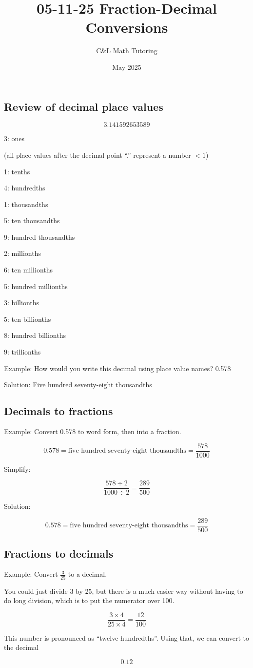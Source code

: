 \documentclass[a4paper, 12pt]{article}
\title{05-11-25 Fraction-Decimal Conversions}
\author{C\&L Math Tutoring}
\date{May 2025}
\begin{document}
\maketitle

\subsection*{Review of decimal place values}

$$3.141592653589$$

3: ones

(all place values after the decimal point ``.'' represent a number $<1$)

1: tenths

4: hundredths

1: thousandths

5: ten thousandths

9: hundred thousandths

2: millionths

6: ten millionths

5: hundred millionths

3: billionths

5: ten billionths

8: hundred billionths

9: trillionths

Example: How would you write this decimal using place value names? 0.578

Solution: Five hundred seventy-eight thousandths

\subsection*{Decimals to fractions}

Example: Convert 0.578 to word form, then into a fraction.

$$0.578 = \text{five hundred seventy-eight thousandths} = \frac{578}{1000}$$

Simplify:

$$\frac{578 \div 2}{1000 \div 2} = \frac{289}{500}$$

Solution:

$$0.578 = \text{five hundred seventy-eight thousandths} = \frac{289}{500}$$

\subsection*{Fractions to decimals}

Example: Convert $\frac{3}{25}$ to a decimal.

You could just divide 3 by 25, but there is a much easier way without having to do long division, which is to put the numerator over 100.

$$\frac{3 \times 4}{25 \times 4} = \frac{12}{100}$$

This number is pronounced as ``twelve hundredths''. Using that, we can convert to the decimal

$$\boxed{0.12}$$
\end{document}

